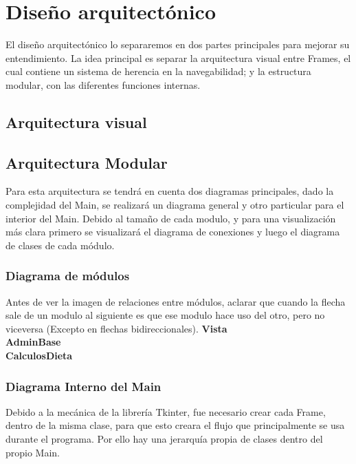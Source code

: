 \section{Diseño arquitectónico}
El diseño arquitectónico lo separaremos en dos partes principales para mejorar su entendimiento. La idea principal es separar la arquitectura visual entre Frames, el cual contiene un sistema de herencia en la navegabilidad; y la estructura modular, con las diferentes funciones internas.
\pagebreak
\subsection{Arquitectura visual}
\subsection{Arquitectura Modular}
Para esta arquitectura se tendrá en cuenta dos diagramas principales, dado la complejidad del Main, se realizará un diagrama general y otro particular para el interior del Main. Debido al tamaño de cada modulo, y para una visualización más clara primero se visualizará el diagrama de conexiones y luego el diagrama de clases de cada módulo.\\
\subsubsection{Diagrama de módulos}
Antes de ver la imagen de relaciones entre módulos, aclarar que cuando la flecha sale de un modulo al siguiente es que ese modulo hace uso del otro, pero no viceversa (Excepto en flechas bidireccionales).
\pagebreak
\textbf{Vista}\\
\pagebreak
\textbf{AdminBase}\\
\textbf{CalculosDieta}\\
\pagebreak
\subsubsection{Diagrama Interno del Main}
Debido a la mecánica de la librería Tkinter, fue necesario crear cada Frame, dentro de la misma clase, para que esto creara el flujo que principalmente se usa durante el programa. Por ello hay una jerarquía propia de clases dentro del propio Main.
